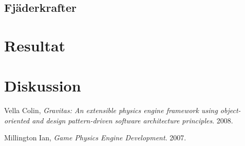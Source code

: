\documentclass[a4paper,12pt,twocolumn,swedish]{article}
\begin{document}
\subsection{Fjäderkrafter}
\section{Resultat}
\section{Diskussion}
\clearpage
\begin{thebibliography}{9}

  Vella Colin,
  \emph{Gravitas: An extensible physics engine framework using object-oriented and design pattern-driven software architecture principles}.
  2008.

  Millington Ian,
  \emph{Game Physics Engine Development}.
  2007.

\end{thebibliography}
\end{document}
